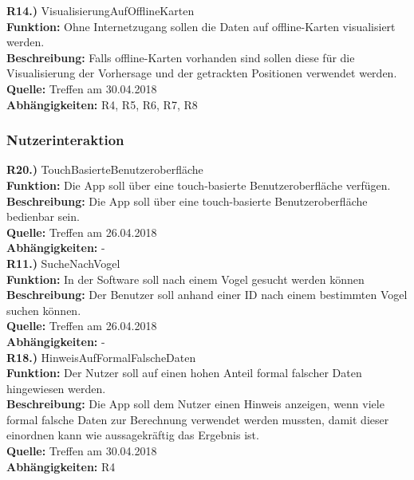 \documentclass[12pt]{article} %
\begin{document}
\textbf{R14.)} VisualisierungAufOfflineKarten\\
\textbf{Funktion:} Ohne Internetzugang sollen die Daten auf offline-Karten visualisiert werden.\\
\textbf{Beschreibung:} Falls offline-Karten vorhanden sind sollen diese für die Visualisierung der Vorhersage und der getrackten Positionen verwendet werden. \\
\textbf{Quelle:} Treffen am 30.04.2018\\
\textbf{Abhängigkeiten:} R4, R5, R6, R7, R8\\


\subsubsection{Nutzerinteraktion}

\textbf{R20.)} TouchBasierteBenutzeroberfläche \\
\textbf{Funktion:} Die App soll über eine touch-basierte Benutzeroberfläche verfügen. \\
\textbf{Beschreibung:} Die App soll über eine touch-basierte Benutzeroberfläche bedienbar sein. \\
\textbf{Quelle:} Treffen am 26.04.2018 \\
\textbf{Abhängigkeiten:} - \\

\textbf{R11.)} SucheNachVogel\\
\textbf{Funktion:} In der Software soll nach einem Vogel gesucht werden können\\
\textbf{Beschreibung:} Der Benutzer soll anhand einer ID nach einem bestimmten Vogel suchen können.\\
\textbf{Quelle:} Treffen am 26.04.2018\\
\textbf{Abhängigkeiten:} -\\

\textbf{R18.)} HinweisAufFormalFalscheDaten \\
\textbf{Funktion:} Der Nutzer soll auf einen hohen Anteil formal falscher Daten hingewiesen werden. \\
\textbf{Beschreibung:} Die App soll dem Nutzer einen Hinweis anzeigen, wenn viele formal falsche Daten zur Berechnung verwendet werden mussten, damit dieser einordnen kann wie aussagekräftig das Ergebnis ist. \\
\textbf{Quelle:} Treffen am 30.04.2018 \\
\textbf{Abhängigkeiten:} R4 \\
\end{document}
